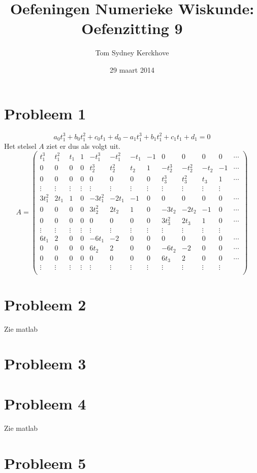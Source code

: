 \documentclass[12pt,a4paper]{article}
\author{Tom Sydney Kerckhove}
\title{Oefeningen Numerieke Wiskunde:\\ Oefenzitting 9}
\date{29 maart 2014}
\begin{document}
\maketitle

\section{Probleem 1}
\[
a_{0}t_1^3+b_0t_1^2+c_0t_1+d_0-a_{1}t_1^3+b_1t_1^2+c_1t_1+d_1=0
\]
Het stelsel $A$ ziet er dus als volgt uit.
\[
A=
\left(
\begin{array}{ccccccccccccccccc}
t_1^3 & t_{1}^2 & t_{1} & 1 & -t_1^3 & -t_1^2 & -t_1 & -1 & 0 & 0 & 0 & 0 & \cdots \\
0 & 0 & 0 & 0 & t_2^3 & t_{2}^2 & t_{2} & 1 & -t_2^3 & -t_2^2 & -t_2 & -1 & \cdots\\
0 & 0 & 0 & 0 & 0 & 0 & 0 & 0 & t_3^3 & t_{3}^2 & t_{3} & 1 & \cdots\\
\vdots & \vdots & \vdots & \vdots & \vdots & \vdots & \vdots & \vdots & \vdots & \vdots & \vdots & \vdots & \\
3t_1^2 & 2t_{1} & 1 & 0 & -3t_1^2 & -2t_1 & -1 & 0 & 0 & 0 & 0 & 0 & \cdots \\
0 & 0 & 0 & 0 & 3t_2^2 & 2t_{2} & 1 & 0 & -3t_2 & -2t_2 & -1 & 0 & \cdots\\
0 & 0 & 0 & 0 & 0 & 0 & 0 & 0 & 3t_3^2 & 2t_{3} & 1 & 0 & \cdots\\
\vdots & \vdots & \vdots & \vdots & \vdots & \vdots & \vdots & \vdots & \vdots & \vdots & \vdots & \vdots & \\
6t_1 & 2 & 0 & 0 & -6t_1 & -2 & 0 & 0 & 0 & 0 & 0 & 0 & \cdots \\
0 & 0 & 0 & 0 & 6t_2 & 2 & 0 & 0 & -6t_2 & -2 & 0 & 0 & \cdots\\
0 & 0 & 0 & 0 & 0 & 0 & 0 & 0 & 6t_3 & 2 & 0 & 0 & \cdots\\
\vdots & \vdots & \vdots & \vdots & \vdots & \vdots & \vdots & \vdots & \vdots & \vdots & \vdots & \vdots & \\
\end{array}
\right)
\]

\section{Probleem 2}
Zie matlab

\section{Probleem 3}

\section{Probleem 4}
Zie matlab

\section{Probleem 5}
\end{document}

